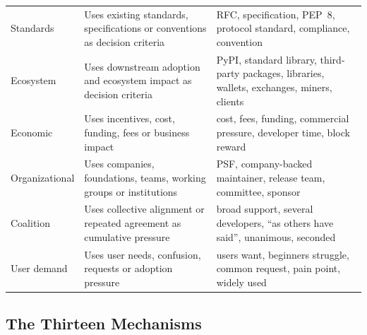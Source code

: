\documentclass[sigconf,screen]{acmart}
\begin{document}
\begin{table}
\begin{tabular}{p{}p{}p{}}
Standards & Uses existing standards, specifications or conventions as decision criteria & RFC, specification, PEP~8, protocol standard, compliance, convention \\
Ecosystem & Uses downstream adoption and ecosystem impact as decision criteria & PyPI, standard library, third-party packages, libraries, wallets, exchanges, miners, clients \\
Economic & Uses incentives, cost, funding, fees or business impact & cost, fees, funding, commercial pressure, developer time, block reward \\
Organizational & Uses companies, foundations, teams, working groups or institutions & PSF, company-backed maintainer, release team, committee, sponsor \\
Coalition & Uses collective alignment or repeated agreement as cumulative pressure & broad support, several developers, ``as others have said'', unanimous, seconded \\
User demand & Uses user needs, confusion, requests or adoption pressure & users want, beginners struggle, common request, pain point, widely used \\
\bottomrule
\end{tabular}
\end{table}

\subsection{The Thirteen Mechanisms}
\end{document}
